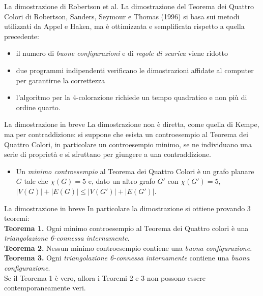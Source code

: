 \documentclass{beamer}
\begin{document}
	\begin{frame}{La dimostrazione di Robertson et al.}
		La dimostrazione del Teorema dei Quattro Colori di Robertson, Sanders, Seymour e Thomas (1996) si basa sui metodi utilizzati da Appel e Haken, ma è ottimizzata e semplificata rispetto a quella precedente:
		\begin{itemize}
			\item il numero di \emph{buone configurazioni} e di \emph{regole di scarica} viene ridotto
			\item due programmi indipendenti verificano le dimostrazioni affidate al computer per garantirne la correttezza
			\item l'algoritmo per la 4-colorazione richiede un tempo quadratico e non più di ordine quarto.
		\end{itemize}
	\end{frame}
	
	\begin{frame}{La dimostrazione in breve}
		La dimostrazione non è diretta, come quella di Kempe, ma per contraddizione: si suppone che esista un controesempio al Teorema dei Quattro Colori, in particolare un controesempio minimo, se ne individuano una serie di proprietà e si sfruttano per giungere a una contraddizione.
		\vspace{0.3cm}
		\begin{itemize}
		    \item Un \emph{minimo controesempio} al Teorema dei Quattro Colori è un grafo planare $G$ tale che $\chi(G) = 5$ e, dato un altro grafo $G'$ con $\chi(G') = 5$, $\lvert V(G) \rvert + \lvert E(G) \rvert \leq \lvert V(G') \rvert + \lvert E(G') \rvert$.
		\end{itemize}
	\end{frame}
	
	\begin{frame}{La dimostrazione in breve}
		In particolare la dimostrazione si ottiene provando 3 teoremi:
		\vspace{0.3cm}
		\\{\bfseries Teorema 1.} Ogni minimo controesempio al Teorema dei Quattro colori è una \emph{triangolazione 6-connessa internamente}.
		\\{\bfseries Teorema 2.} Nessun minimo controesempio contiene una \emph{buona configurazione}.
		\\{\bfseries Teorema 3.} Ogni \emph{triangolazione 6-connessa internamente} contiene una \emph{buona configurazione}.
		\vspace{0.3cm}
		\\Se il Teorema 1 è vero, allora i Teoremi 2 e 3 non possono essere contemporaneamente veri.
	\end{frame}
	
\end{document}
